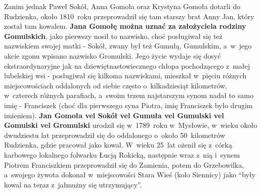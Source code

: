 Zanim jednak Paweł Sokół, Anna Gomoła oraz Krystyna Gomoła dotarli do 
Rudzienka, około 1810~roku przeprowadził się tam starszy brat Anny Jan, 
który został tam kowalem. \textbf{Jana Gomołę można uznać za założyciela 
rodziny Gomulskich}, jako pierwszy nosił to nazwisko, choć posługiwał się też 
nazwiskiem swojej matki - Sokół, zwany był też Gumułą, Gumulskim, a~w~jego 
akcie zgonu wpisano nazwisko Gromulski. Jego życie wydaje się dosyć 
ekstraordynaryjne jak na dziewiętnastowiecznego chłopa pochodzącego z~małej 
lubelskiej wsi - posługiwał się kilkoma nazwiskami, mieszkał w~pięciu
różnych miejscowościach oddalonych od siebie często o~kilkadziesiąt 
kilometrów, w~czterech różnych parafiach, a~swoim trzem najstarszym synom 
nadał to samo imię - Franciszek (choć dla pierwszego syna Piotra, imię 
Franciszek było drugim imieniem). \textbf{Jan Gomoła vel Sokół vel Gumuła vel 
Gumulski vel Gomulski vel Gromulski} urodził się w~1789~roku w~Mysłowie, 
w~wieku około dwudziestu lat przeprowadził się do oddalonego o~około 
50~kilometrów Rudzienka, gdzie pracował jako kowal. W~wieku 25~lat ożenił się 
z~córką karbowego lokalnego folwarku Łucją Rokicką, następnie wraz z~nią 
i~synem Piotrem Franciszkiem przeprowadził się do Zamienia, potem do 
Grzebowilka, a~swojego żywota dokonał w~miejscowości Stara Wieś (koło 
Siennicy) jako \enquote{były kowal na teraz z~jałmużny się utrzymujący}.